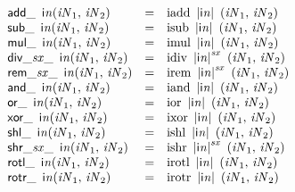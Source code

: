 $$
\begin{array}{@{}lcl@{}l@{}}
{{\mathsf{add}}{\mathsf{\_}}~\,{\mathsf{i}}{{\mathit{n}}}}{({\mathit{iN}}_{{1}},\, {\mathit{iN}}_{{2}})} &=& {\mathrm{iadd}}~\,{|{\mathsf{i}}{{\mathit{n}}}|}~\,({\mathit{iN}}_{{1}},\, {\mathit{iN}}_{{2}}) &  \\
{{\mathsf{sub}}{\mathsf{\_}}~\,{\mathsf{i}}{{\mathit{n}}}}{({\mathit{iN}}_{{1}},\, {\mathit{iN}}_{{2}})} &=& {\mathrm{isub}}~\,{|{\mathsf{i}}{{\mathit{n}}}|}~\,({\mathit{iN}}_{{1}},\, {\mathit{iN}}_{{2}}) &  \\
{{\mathsf{mul}}{\mathsf{\_}}~\,{\mathsf{i}}{{\mathit{n}}}}{({\mathit{iN}}_{{1}},\, {\mathit{iN}}_{{2}})} &=& {\mathrm{imul}}~\,{|{\mathsf{i}}{{\mathit{n}}}|}~\,({\mathit{iN}}_{{1}},\, {\mathit{iN}}_{{2}}) &  \\
{{{\mathsf{div\_}}{{\mathit{sx}}}}{\mathsf{\_}}~\,{\mathsf{i}}{{\mathit{n}}}}{({\mathit{iN}}_{{1}},\, {\mathit{iN}}_{{2}})} &=& {\mathrm{idiv}}~\,{{|{\mathsf{i}}{{\mathit{n}}}|}^{{\mathit{sx}}}}~\,({\mathit{iN}}_{{1}},\, {\mathit{iN}}_{{2}}) &  \\
{{{\mathsf{rem\_}}{{\mathit{sx}}}}{\mathsf{\_}}~\,{\mathsf{i}}{{\mathit{n}}}}{({\mathit{iN}}_{{1}},\, {\mathit{iN}}_{{2}})} &=& {\mathrm{irem}}~\,{{|{\mathsf{i}}{{\mathit{n}}}|}^{{\mathit{sx}}}}~\,({\mathit{iN}}_{{1}},\, {\mathit{iN}}_{{2}}) &  \\
{{\mathsf{and}}{\mathsf{\_}}~\,{\mathsf{i}}{{\mathit{n}}}}{({\mathit{iN}}_{{1}},\, {\mathit{iN}}_{{2}})} &=& {\mathrm{iand}}~\,{|{\mathsf{i}}{{\mathit{n}}}|}~\,({\mathit{iN}}_{{1}},\, {\mathit{iN}}_{{2}}) &  \\
{{\mathsf{or}}{\mathsf{\_}}~\,{\mathsf{i}}{{\mathit{n}}}}{({\mathit{iN}}_{{1}},\, {\mathit{iN}}_{{2}})} &=& {\mathrm{ior}}~\,{|{\mathsf{i}}{{\mathit{n}}}|}~\,({\mathit{iN}}_{{1}},\, {\mathit{iN}}_{{2}}) &  \\
{{\mathsf{xor}}{\mathsf{\_}}~\,{\mathsf{i}}{{\mathit{n}}}}{({\mathit{iN}}_{{1}},\, {\mathit{iN}}_{{2}})} &=& {\mathrm{ixor}}~\,{|{\mathsf{i}}{{\mathit{n}}}|}~\,({\mathit{iN}}_{{1}},\, {\mathit{iN}}_{{2}}) &  \\
{{\mathsf{shl}}{\mathsf{\_}}~\,{\mathsf{i}}{{\mathit{n}}}}{({\mathit{iN}}_{{1}},\, {\mathit{iN}}_{{2}})} &=& {\mathrm{ishl}}~\,{|{\mathsf{i}}{{\mathit{n}}}|}~\,({\mathit{iN}}_{{1}},\, {\mathit{iN}}_{{2}}) &  \\
{{{\mathsf{shr\_}}{{\mathit{sx}}}}{\mathsf{\_}}~\,{\mathsf{i}}{{\mathit{n}}}}{({\mathit{iN}}_{{1}},\, {\mathit{iN}}_{{2}})} &=& {\mathrm{ishr}}~\,{{|{\mathsf{i}}{{\mathit{n}}}|}^{{\mathit{sx}}}}~\,({\mathit{iN}}_{{1}},\, {\mathit{iN}}_{{2}}) &  \\
{{\mathsf{rotl}}{\mathsf{\_}}~\,{\mathsf{i}}{{\mathit{n}}}}{({\mathit{iN}}_{{1}},\, {\mathit{iN}}_{{2}})} &=& {\mathrm{irotl}}~\,{|{\mathsf{i}}{{\mathit{n}}}|}~\,({\mathit{iN}}_{{1}},\, {\mathit{iN}}_{{2}}) &  \\
{{\mathsf{rotr}}{\mathsf{\_}}~\,{\mathsf{i}}{{\mathit{n}}}}{({\mathit{iN}}_{{1}},\, {\mathit{iN}}_{{2}})} &=& {\mathrm{irotr}}~\,{|{\mathsf{i}}{{\mathit{n}}}|}~\,({\mathit{iN}}_{{1}},\, {\mathit{iN}}_{{2}}) &  \\
\end{array}
$$

